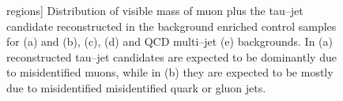 \begin{figure}
\begin{center}
regions]{\captiontext 
	 Distribution of visible mass of muon plus the tau--jet candidate reconstructed
         in the background enriched control samples for 
         \ZMM (a) and (b), \WpJets (c), \ttbarpJets (d) and QCD multi--jet (e) backgrounds.
         In (a) reconstructed tau--jet candidates are expected to be dominantly due to misidentified muons,
         while in (b) they are expected to be mostly due to misidentified misidentified quark or gluon jets.}
\label{fig:VisMassMuTauBgControlRegions}
\end{center}
\end{figure} 

